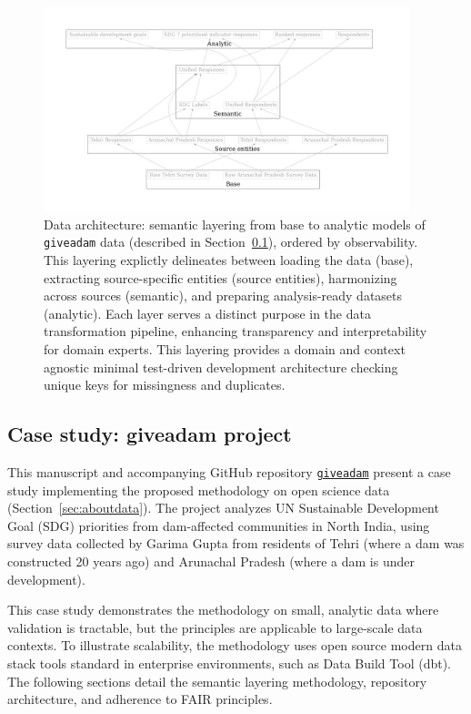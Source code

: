 \documentclass{article}
\begin{document}
\begin{figure}[ht]
  \centering
  \includegraphics[width=0.95\textwidth]{figures/architecture.pdf}
  \caption[Data architecture]{Data architecture: semantic layering from base to analytic models of \texttt{giveadam} data (described in Section~\ref{sec:case-study}), ordered by observability. This layering explictly delineates between loading the data (base), extracting source-specific entities (source entities), harmonizing across sources (semantic), and preparing analysis-ready datasets (analytic). Each layer serves a distinct purpose in the data transformation pipeline, enhancing transparency and interpretability for domain experts. This layering provides a domain and context agnostic minimal test-driven development architecture checking unique keys for missingness and duplicates.}
  \label{fig:architecture}
\end{figure}

\subsection{Case study: giveadam project}
\label{sec:case-study}

This manuscript and accompanying GitHub repository \href{https://github.com/softloud/giveadam}{\texttt{giveadam}} present a case study implementing the proposed methodology on open science data (Section~\ref{sec:aboutdata}). The project analyzes UN Sustainable Development Goal (SDG) priorities from dam-affected communities in North India, using survey data collected by Garima Gupta from residents of Tehri (where a dam was constructed 20 years ago) and Arunachal Pradesh (where a dam is under development).

This case study demonstrates the methodology on small, analytic data where validation is tractable, but the principles are applicable to large-scale data contexts. To illustrate scalability, the methodology uses open source modern data stack tools standard in enterprise environments, such as Data Build Tool (dbt). The following sections detail the semantic layering methodology, repository architecture, and adherence to FAIR principles.
\end{document}
